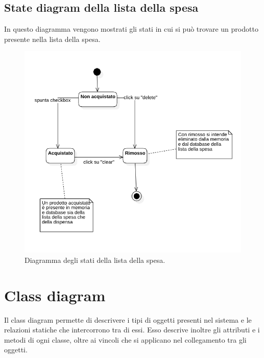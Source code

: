 \newpage

\subsection{State diagram della lista della spesa}

In questo diagramma vengono mostrati gli stati in cui si può trovare un prodotto presente nella lista della spesa.

\begin{figure}[H]
    \includegraphics[width=\linewidth]{images/state-shopping-list.png}
    \caption{Diagramma degli stati della lista della spesa.}
    \label{fig:stateshoplist}
\end{figure}

\newpage

\section{Class diagram}

Il class diagram permette di descrivere i tipi di oggetti presenti nel sistema e le relazioni statiche che intercorrono tra di essi. Esso descrive inoltre gli attributi e i metodi di ogni classe, oltre ai vincoli che si applicano nel collegamento tra gli oggetti.

